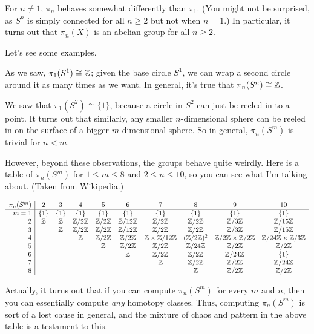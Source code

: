 For $n \neq 1$, $\pi_n$ behaves somewhat differently than $\pi_1$.
(You might not be surprised, as $S^n$ is simply connected for all $n \ge 2$ but not when $n=1$.)
In particular, it turns out that $\pi_n(X)$ is an abelian group for all $n \ge 2$.

Let's see some examples.
\begin{example}
	As we saw, $\pi_1(S^1) \cong \mathbb Z$; given the base circle $S^1$,
	we can wrap a second circle around it as many times as we want.
	In general, it's true that $\pi_n(S^n) \cong \mathbb Z$.
\end{example}
\begin{example}
	We saw that $\pi_1(S^2) \cong \{1\}$, because 
	a circle in $S^2$ can just be reeled in to a point.
	It turns out that similarly, any smaller $n$-dimensional sphere
	can be reeled in on the surface of a bigger $m$-dimensional sphere.
	So in general, $\pi_n(S^m)$ is trivial for $n < m$.
\end{example}
However, beyond these observations, the groups behave quite weirdly.
Here is a table of $\pi_n(S^m)$ for $1 \le m \le 8$ and $2 \le n \le 10$,
so you can see what I'm talking about.
(Taken from Wikipedia.)

\bgroup
\footnotesize
\[
	\begin{array}{r|ccccccccc}
		\pi_n(S^m) & 2 & 3 & 4 & 5 & 6 & 7 & 8 & 9 & 10 \\ \hline
		m = 1 & \{1\} & \{1\} & \{1\} & \{1\} & \{1\} & \{1\} & \{1\} & \{1\} & \{1\} \\
		2 &  \mathbb Z & \mathbb Z & \mathbb Z/2\mathbb Z & \mathbb Z/2\mathbb Z & \mathbb Z/12\mathbb Z & \mathbb Z/2\mathbb Z & \mathbb Z/2\mathbb Z & \mathbb Z/3\mathbb Z & \mathbb Z/15\mathbb Z\\
		3 & & \mathbb Z & \mathbb Z/2\mathbb Z & \mathbb Z/2\mathbb Z & \mathbb Z/12\mathbb Z & \mathbb Z/2\mathbb Z & \mathbb Z/2\mathbb Z & \mathbb Z/3\mathbb Z & \mathbb Z/15\mathbb Z\\
		4 & &  & \mathbb Z & \mathbb Z/2\mathbb Z & \mathbb Z/2\mathbb Z & \mathbb Z \times \mathbb Z/12\mathbb Z & (\mathbb Z/2\mathbb Z)^2 & \mathbb Z/2\mathbb Z \times \mathbb Z/2\mathbb Z & \mathbb Z/24\mathbb Z \times \mathbb Z/3\mathbb Z \\
		5 & &  &  & \mathbb Z & \mathbb Z/2\mathbb Z & \mathbb Z/2\mathbb Z & \mathbb Z/24\mathbb Z & \mathbb Z/2\mathbb Z & \mathbb Z/2\mathbb Z \\
		6 & &  &  &  & \mathbb Z & \mathbb Z/2\mathbb Z & \mathbb Z/2\mathbb Z & \mathbb Z/24\mathbb Z & \{1\} \\
		7 & &  &  &  &  & \mathbb Z & \mathbb Z/2\mathbb Z & \mathbb Z/2\mathbb Z & \mathbb Z/24\mathbb Z \\
		8 & &  &  &  &  &  & \mathbb Z & \mathbb Z/2\mathbb Z & \mathbb Z/2\mathbb Z
	\end{array}
\]
\egroup

Actually, it turns out that if you can compute $\pi_n(S^m)$
for every $m$ and $n$,
then you can essentially compute \emph{any} homotopy classes.
Thus, computing $\pi_n(S^m)$ is sort of a lost cause in general,
and the mixture of chaos and pattern in the above table is a testament to this.

